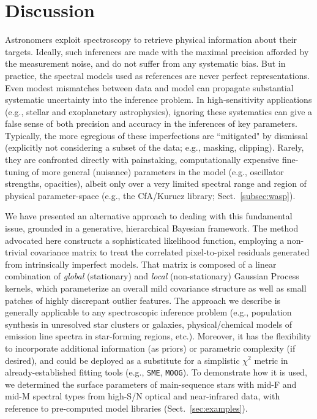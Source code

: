 \documentclass[iop,floatfix]{emulateapj}
\begin{document}
\section{Discussion} \label{sec:discussion}

Astronomers exploit spectroscopy to retrieve physical information about their targets.  Ideally, 
such inferences are made with the maximal precision afforded by the measurement noise, and do not 
suffer from any systematic bias.  But in practice, the spectral models used as references are never 
perfect representations.  Even modest mismatches between data and model can propagate substantial 
systematic uncertainty into the inference problem.  In high-sensitivity applications (e.g., stellar 
and exoplanetary astrophysics), ignoring these systematics can give a false sense of both precision 
and accuracy in the inferences of key parameters.  Typically, the more egregious of these 
imperfections are ``mitigated" by dismissal (explicitly not considering a subset of the data; e.g., 
masking, clipping).  Rarely, they are confronted directly with painstaking, computationally 
expensive fine-tuning of more general (nuisance) parameters in the model (e.g., oscillator 
strengths, opacities), albeit only over a very limited spectral range and region of physical 
parameter-space (e.g., the {\sc CfA/Kurucz} library; Sect.~\ref{subsec:wasp}).

We have presented an alternative approach to dealing with this fundamental issue, grounded in a 
generative, hierarchical Bayesian framework.  The method advocated here constructs a sophisticated 
likelihood function, employing a non-trivial covariance matrix to treat the correlated 
pixel-to-pixel residuals generated from intrinsically imperfect models.  That matrix is composed of 
a linear combination of {\it global} (stationary) and {\it local} (non-stationary) Gaussian 
Process kernels, which parameterize an overall mild covariance structure as well as small patches 
of highly discrepant outlier features.  The approach we describe is generally applicable to any 
spectroscopic inference problem (e.g., population synthesis in unresolved star clusters or 
galaxies, physical/chemical models of emission line spectra in star-forming regions, etc.).  
Moreover, it has the flexibility to incorporate additional information (as priors) or parametric 
complexity (if desired), and could be deployed as a substitute for a simplistic $\chi^2$ metric in 
already-established fitting tools (e.g., {\tt SME}, {\tt MOOG}).  To demonstrate how it is used, we 
determined the surface parameters of main-sequence stars with mid-F and mid-M spectral types from 
high-S/N optical and near-infrared data, with reference to pre-computed model libraries 
(Sect.~\ref{sec:examples}).
\end{document}
